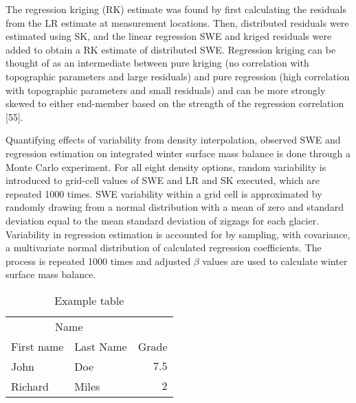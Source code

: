 \documentclass[twoside,twocolumn]{article}
\begin{document}
The regression kriging (RK) estimate was found by first calculating the residuals from the LR estimate at measurement locations. Then, distributed residuals were estimated using SK, and the linear regression SWE and kriged residuals were added to obtain a RK estimate of distributed SWE. Regression kriging can be thought of as an intermediate between pure kriging (no correlation with topographic parameters and large residuals) and pure regression (high correlation with topographic parameters and small residuals) and can be more strongly skewed to either end-member based on the strength of the regression correlation [55].

Quantifying effects of variability from density interpolation, observed SWE and regression estimation on integrated winter surface mass balance is done through a Monte Carlo experiment. For all eight density options, random variability is introduced to grid-cell values of SWE and LR and SK executed, which are repeated 1000 times. SWE variability within a grid cell is approximated by randomly drawing from a normal distribution with a mean of zero and standard deviation equal to the mean standard deviation of zigzags for each glacier. Variability in regression estimation is accounted for by sampling, with covariance, a multivariate normal distribution of calculated regression coefficients. The process is repeated 1000 times and adjusted $\beta$ values are used to calculate winter surface mass balance. 



\begin{table}
\caption{Example table}
\centering
\begin{tabular}{llr}
\toprule
\multicolumn{2}{c}{Name} \\
\cmidrule(r){1-2}
First name & Last Name & Grade \\
\midrule
John & Doe & $7.5$ \\
Richard & Miles & $2$ \\
\bottomrule
\end{tabular}
\end{table}


\end{document}
